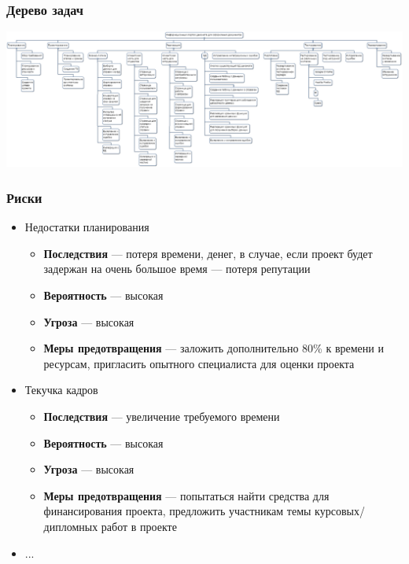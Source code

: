\documentclass[xetex,mathserif,serif]{beamer}
\begin{document}
	\begin{frame}
		\frametitle{Дерево задач}
		\begin{center}
			\includegraphics[width=\textwidth]{wbs.png}
		\end{center}
	\end{frame}

	\begin{frame}
		\frametitle{Риски}
		\begin{itemize}
			\item Недостатки планирования
			\begin{itemize}
				\item \textbf{Последствия} --- потеря времени, денег, в случае, если проект будет задержан на очень большое время --- потеря репутации
				\item \textbf{Вероятность} --- высокая
				\item \textbf{Угроза} --- высокая
				\item \textbf{Меры предотвращения} --- заложить дополнительно 80\% к времени и ресурсам, пригласить опытного специалиста для оценки проекта
			\end{itemize}
			\item Текучка кадров
			\begin{itemize}
				\item \textbf{Последствия} --- увеличение требуемого времени
				\item \textbf{Вероятность} --- высокая
				\item \textbf{Угроза} --- высокая
				\item \textbf{Меры предотвращения} --- попытаться найти средства для финансирования проекта, предложить участникам темы курсовых/дипломных работ в проекте
			\end{itemize}
			\item ...
		\end{itemize}
	\end{frame}
\end{document}
